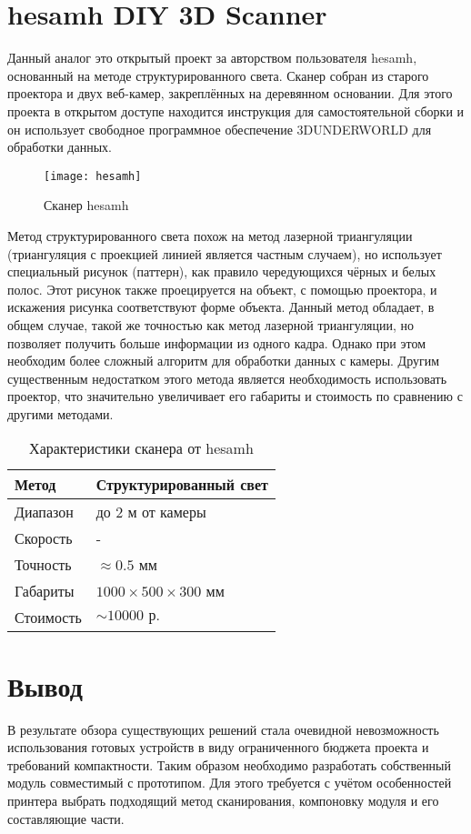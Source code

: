     \section{hesamh DIY 3D Scanner}
        Данный аналог это открытый проект за авторством пользователя hesamh, основанный на методе структурированного света\cite{hesamh}. Сканер собран из старого проектора и двух веб-камер, закреплённых на деревянном основании. Для этого проекта в открытом доступе находится инструкция для самостоятельной сборки и он использует свободное программное обеспечение 3DUNDERWORLD для обработки данных.

        \begin{figure}[!ht]
            \centering
            \texttt{[image: hesamh]}\label{pic:hesamh}
            \caption{Сканер hesamh}
        \end{figure}
        
        Метод структурированного света похож на метод лазерной триангуляции (триангуляция с проекцией линией является частным случаем), но использует специальный рисунок (паттерн), как правило чередующихся чёрных и белых полос. Этот рисунок также проецируется на объект, с помощью проектора, и искажения рисунка соответствуют форме объекта. Данный метод обладает, в общем случае, такой же точностью как метод лазерной триангуляции, но позволяет получить больше информации из одного кадра. Однако при этом необходим более сложный алгоритм для обработки данных с камеры. Другим существенным недостатком этого метода является необходимость использовать проектор, что значительно увеличивает его габариты и стоимость по сравнению с другими методами.
        
        \begin{table}[H]
            \centering
            \caption{Характеристики сканера от hesamh}\label{table:hesamh}
            \begin{tabular}{|l|l|}\hline
            Метод&Структурированный свет\\ \hline
            Диапазон&до 2 м от камеры\\ \hline
            Скорость&-\\ \hline
            Точность&$\approx 0.5$ мм\\ \hline
            Габариты&$ 1000 \times 500 \times 300 $ мм\\ \hline
            Стоимость&$\sim 10 000\text{ р.}$\\ \hline
            \end{tabular}
        \end{table}
        
    \section{Вывод}
        В результате обзора существующих решений стала очевидной невозможность использования готовых устройств в виду ограниченного бюджета проекта и требований компактности. Таким образом необходимо разработать собственный модуль совместимый с прототипом. Для этого требуется с учётом особенностей принтера выбрать подходящий метод сканирования, компоновку модуля и его составляющие части.